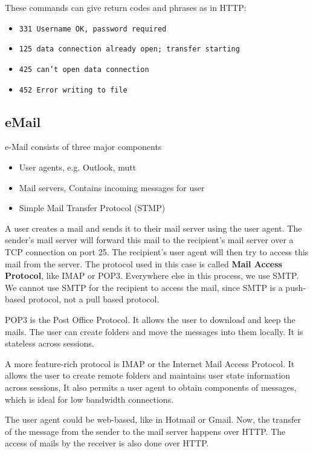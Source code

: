 \documentclass[12pt,letterpaper]{article}
\theoremstyle{definition}
\begin{document}
These commands can give return codes and phrases as in HTTP:

\begin{itemize}
  \item \texttt{331 Username OK, password required}
  \item \texttt{125 data connection already open; transfer starting}
  \item \texttt{425 can't open data connection}
  \item \texttt{452 Error writing to file}
\end{itemize}

\subsection{eMail}

e-Mail consists of three major components

\begin{itemize}
  \item User agents, e.g. Outlook, mutt
  \item Mail servers, Contains incoming messages for user
  \item Simple Mail Transfer Protocol (STMP)
\end{itemize}

A user creates a mail and sends it to their mail server using the user agent. The sender's mail server will forward this mail to the recipient's mail server over a TCP connection on port 25. The recipient's user agent will then try to access this mail from the server. The protocol used in this case is called \textbf{Mail Access Protocol}, like IMAP or POP3. Everywhere else in this process, we use SMTP. We cannot use SMTP for the recipient to access the mail, since SMTP is a push-based protocol, not a pull based protocol.

POP3 is the Post Office Protocol. It allows the user to download and keep the mails. The user can create folders and move the messages into them locally. It is stateless across sessions.

A more feature-rich protocol is IMAP or the Internet Mail Access Protocol. It allows the user to create remote folders and maintains user state information across sessions, It also permits a user agent to obtain components of messages, which is ideal for low bandwidth connections.

The user agent could be web-based, like in Hotmail or Gmail. Now, the transfer of the message from the sender to the mail server happens over HTTP. The access of mails by the receiver is also done over HTTP.
\end{document}
